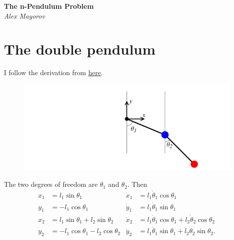 \documentclass[11pt, leqno]{article}
\def\doc{The n-Pendulum Problem}
\begin{document}
\thispagestyle{empty}

\begin{center}
	\textbf{\LARGE\doc}\\
	\vspace{.85em}
	\textit{\large Alex Mayorov}
\end{center}
\vspace{1em}

\section{The double pendulum}

I follow the derivation from \href{https://scipython.com/blog/the-double-pendulum/}{here}.

\begin{figure}[H]
        \centering
        \includegraphics[scale=0.6]{fig/double-pendulum-geometry}
\end{figure}

The two degrees of freedom are $\theta_1$ and $\theta_2$. Then
\begin{align*}
	x_1 &= l_1\sin\theta_1 & \dot x_1 &= l_1 \dot \theta_1 \cos\theta_1 \\
	y_1 &= -l_1 \cos\theta_1 & \dot y_1 &= l_1\dot \theta_1 \sin\theta_1\\
	x_2 &= l_1\sin\theta_1 + l_2\sin\theta_2 & \dot x_2 &= l_1 \dot \theta_1 \cos\theta_1 + l_2 \dot \theta_2 \cos\theta_2\\
	y_2 &= -l_1 \cos\theta_1 - l_2\cos\theta_2 & \dot y_2 &= l_1\dot \theta_1 \sin \theta_1 + l_2 \dot \theta_2 \sin \theta_2
.\end{align*}
\end{document}

